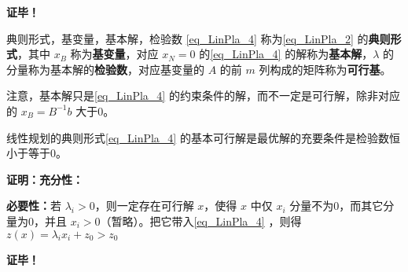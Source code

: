 \textbf{证毕！}

\begin{definition}{典则形式，基变量，基本解，检验数}
\autoref{eq_LinPla_4} 称为\autoref{eq_LinPla_2} 的\textbf{典则形式}，其中 $x_B$ 称为\textbf{基变量}，对应 $x_N=0$ 的\autoref{eq_LinPla_4} 的解称为\textbf{基本解}，$\lambda$ 的分量称为基本解的\textbf{检验数}，对应基变量的 $A$ 的前 $m$ 列构成的矩阵称为\textbf{可行基}。 
\end{definition}
注意，基本解只是\autoref{eq_LinPla_4} 的约束条件的解，而不一定是可行解，除非对应的 $x_B=B^{-1}b$ 大于0。 
\begin{corollary}{}
线性规划的典则形式\autoref{eq_LinPla_4} 的基本可行解是最优解的充要条件是检验数恒小于等于0。
\end{corollary}
\textbf{证明：}\textbf{充分性：}


\textbf{必要性：}若 $\lambda_i>0$，则一定存在可行解 $x$，使得 $x$ 中仅 $x_i$ 分量不为0，而其它分量为0，并且 $x_i>0$（暂略）。把它带入\autoref{eq_LinPla_4} ，则得 $z(x)=\lambda_ix_i+z_0> z_0$


\textbf{证毕！}




